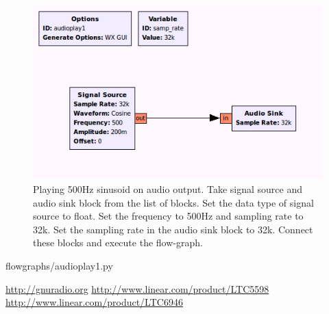 \documentclass[a4paper,10pt]{report}
\begin{document}
\begin{figure}
\centering
 \includegraphics[scale=0.80]{figures/audio-play1.png}
 \caption{Playing 500Hz sinusoid on audio output.
 Take signal source and audio sink block from the list of blocks.
 Set the data type of signal source to float.
 Set the frequency to 500Hz and sampling rate to 32k.
 Set the sampling rate in the audio sink block to 32k.
 Connect these blocks and execute the flow-graph.\label{fig:audio-play1}}
\end{figure}

\begin{appendices}

{flowgraphs/audioplay1.py}
\end{appendices}

% 
% 


\begin{thebibliography}{9}
 \url{http://gnuradio.org}
 \url{http://www.linear.com/product/LTC5598} 
 \url{http://www.linear.com/product/LTC6946} 
 
 \end{thebibliography}
\end{document}

